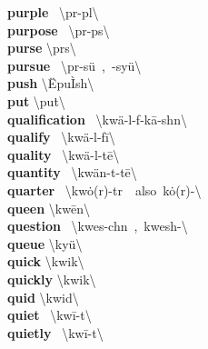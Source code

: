 \documentclass[10pt,a4paper]{article}
\begin{document}
\begin{multicols}{2}
\textbf{ purple }\quad \ \textbackslash \textprimstress p\textschwa r-p\textschwa l\textbackslash \\
\textbf{ purpose }\quad \ \textbackslash \textprimstress p\textschwa r-p\textschwa s\textbackslash \\
\textbf{ purse }\quad \textbackslash \textprimstress p\textschwa rs\textbackslash \\
\textbf{ pursue }\quad \ \textbackslash p\textschwa r-\textprimstress s\"{u}\ ,\ -\textprimstress sy\"{u}\textbackslash \\
\textbf{ push }\quad \textbackslash \"{E}\textsuperscript{\pwedge}pu\`{I}\ddag sh\textbackslash \\
\textbf{ put }\quad \textbackslash \textprimstress pu\. t\textbackslash \\
\textbf{ qualification }\quad \ \textbackslash \textsecstress kw\"{a}-l\textschwa -f\textschwa -\textprimstress k\={a}-sh\textschwa n\textbackslash \\
\textbf{ qualify }\quad \ \textbackslash \textprimstress kw\"{a}-l\textschwa -\textsecstress f\={i}\textbackslash \\
\textbf{ quality }\quad \ \textbackslash \textprimstress kw\"{a}-l\textschwa -t\={e}\textbackslash \\
\textbf{ quantity }\quad \ \textbackslash \textprimstress kw\"{a}n-t\textschwa -t\={e}\textbackslash \\
\textbf{ quarter }\quad \ \textbackslash \textprimstress kw\.{o}(r)-t\textschwa r\ \ also\ \textprimstress k\.{o}(r)-\textbackslash \\
\textbf{ queen }\quad \textbackslash \textprimstress kw\={e}n\textbackslash \\
\textbf{ question }\quad \ \textbackslash \textprimstress kwes-ch\textschwa n\ ,\ \textprimstress kwesh-\textbackslash \\
\textbf{ queue }\quad \textbackslash \textprimstress ky\"{u}\textbackslash \\
\textbf{ quick }\quad \textbackslash \textprimstress kwik\textbackslash \\
\textbf{ quickly }\quad \textbackslash \textprimstress kwik\textbackslash \\
\textbf{ quid }\quad \textbackslash \textprimstress kwid\textbackslash \\
\textbf{ quiet }\quad \ \textbackslash \textprimstress kw\={i}-\textschwa t\textbackslash \\
\textbf{ quietly }\quad \ \textbackslash \textprimstress kw\={i}-\textschwa t\textbackslash \\

\end{multicols}
\end{document}
